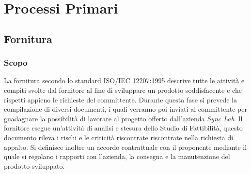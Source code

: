 \chapter{Processi Primari}
\section{Fornitura}
\subsection{Scopo}
La fornitura secondo lo standard ISO/IEC 12207:1995 descrive tutte le attività e compiti svolte dal fornitore al fine di sviluppare un prodotto soddisfacente e che rispetti appieno le richieste del committente.
Durante questa fase si prevede la compilazione di diversi documenti, i quali verranno poi inviati al committente per guadagnare la possibilità di lavorare al progetto offerto dall'azienda \emph{Sync Lab}.
Il fornitore esegue un'attività di analisi e stesura dello Studio di Fattibilità, questo documento rileva i rischi e le criticità riscontrate riscontrate nella richiesta di appalto.
Si definisce inoltre un accordo contrattuale con il proponente mediante il quale si regolano i rapporti con l'azienda, la consegna e la manutenzione del prodotto sviluppato. 

